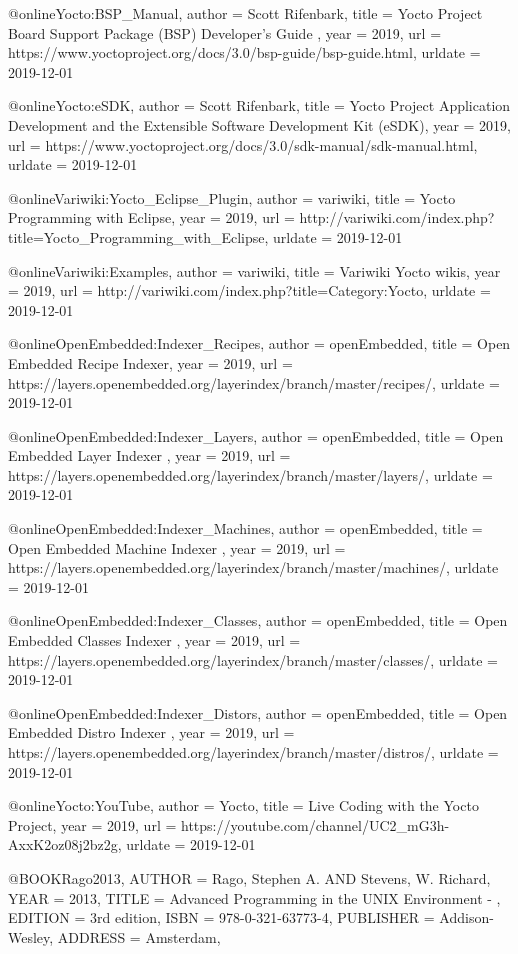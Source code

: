 @online{Yocto:BSP_Manual,
author = {Scott Rifenbark},
title = {Yocto Project Board Support Package (BSP) Developer's Guide },
year = 2019,
url = {https://www.yoctoproject.org/docs/3.0/bsp-guide/bsp-guide.html},
urldate = {2019-12-01}
}

@online{Yocto:eSDK,
author = {Scott Rifenbark},
title = {Yocto Project Application Development and the Extensible Software Development Kit (eSDK)},
year = 2019,
url = {https://www.yoctoproject.org/docs/3.0/sdk-manual/sdk-manual.html},
urldate = {2019-12-01}
}

@online{Variwiki:Yocto_Eclipse_Plugin,
author = {variwiki},
title = {Yocto Programming with Eclipse},
year = 2019,
url = {http://variwiki.com/index.php?title=Yocto_Programming_with_Eclipse},
urldate = {2019-12-01}
}

@online{Variwiki:Examples,
author = {variwiki},
title = {Variwiki Yocto wikis},
year = 2019,
url = {http://variwiki.com/index.php?title=Category:Yocto},
urldate = {2019-12-01}
}


@online{OpenEmbedded:Indexer_Recipes,
author = {openEmbedded},
title = {Open Embedded Recipe Indexer},
year = 2019,
url = {https://layers.openembedded.org/layerindex/branch/master/recipes/},
urldate = {2019-12-01}
}


@online{OpenEmbedded:Indexer_Layers,
author = {openEmbedded},
title = {Open Embedded Layer Indexer },
year = 2019,
url = {https://layers.openembedded.org/layerindex/branch/master/layers/},
urldate = {2019-12-01}
}


@online{OpenEmbedded:Indexer_Machines,
author = {openEmbedded},
title = {Open Embedded Machine Indexer },
year = 2019,
url = {https://layers.openembedded.org/layerindex/branch/master/machines/},
urldate = {2019-12-01}
}

@online{OpenEmbedded:Indexer_Classes,
author = {openEmbedded},
title = {Open Embedded Classes Indexer },
year = 2019,
url = {https://layers.openembedded.org/layerindex/branch/master/classes/},
urldate = {2019-12-01}
}

@online{OpenEmbedded:Indexer_Distors,
author = {openEmbedded},
title = {Open Embedded Distro Indexer },
year = 2019,
url = {https://layers.openembedded.org/layerindex/branch/master/distros/},
urldate = {2019-12-01}
}

@online{Yocto:YouTube,
author = {Yocto},
title = {Live Coding with the Yocto Project},
year = 2019,
url = {https://youtube.com/channel/UC2_mG3h-AxxK2oz08j2bz2g},
urldate = {2019-12-01}
}

@BOOK{Rago2013,
	AUTHOR = {Rago, Stephen A. AND Stevens, W. Richard},
	YEAR = {2013},
	TITLE = {Advanced Programming in the UNIX Environment - },
	EDITION = {3rd edition},
	ISBN = {978-0-321-63773-4},
	PUBLISHER = {Addison-Wesley},
	ADDRESS = {Amsterdam},
}


